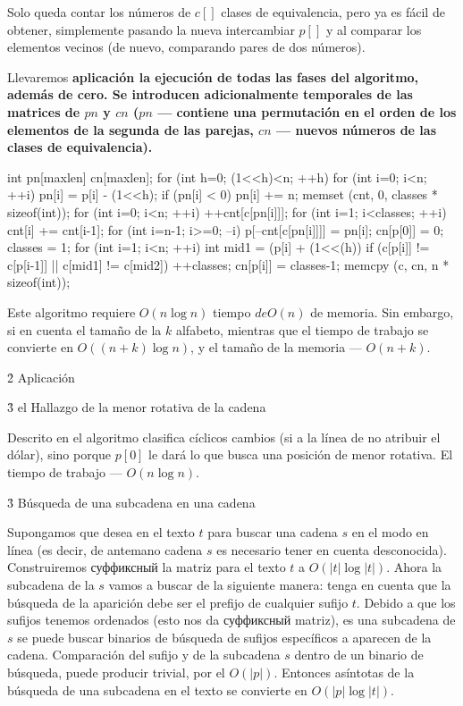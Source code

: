 Solo queda contar los números de $c[]$ clases de equivalencia, pero ya es fácil de obtener, simplemente pasando la nueva intercambiar $p[]$ y al comparar los elementos vecinos (de nuevo, comparando pares de dos números).

Llevaremos \bf{aplicación} la ejecución de todas las fases del algoritmo, además de cero. Se introducen adicionalmente temporales de las matrices de $pn$ y $cn$ ($pn$ --- contiene una permutación en el orden de los elementos de la segunda de las parejas, $cn$ --- nuevos números de las clases de equivalencia).

\code
int pn[maxlen] cn[maxlen];
for (int h=0; (1<<h)<n; ++h) {
for (int i=0; i<n; ++i) {
pn[i] = p[i] - (1<<h);
if (pn[i] < 0) pn[i] += n;
}
memset (cnt, 0, classes * sizeof(int));
for (int i=0; i<n; ++i)
++cnt[c[pn[i]]];
for (int i=1; i<classes; ++i)
cnt[i] += cnt[i-1];
for (int i=n-1; i>=0; --i)
p[--cnt[c[pn[i]]]] = pn[i];
cn[p[0]] = 0;
classes = 1;
for (int i=1; i<n; ++i) {
int mid1 = (p[i] + (1<<(h)) %
if (c[p[i]] != c[p[i-1]] || c[mid1] != c[mid2])
++classes;
cn[p[i]] = classes-1;
}
memcpy (c, cn, n * sizeof(int));
}
\endcode

Este algoritmo requiere $O(n \log n)$ tiempo $de O(n)$ de memoria. Sin embargo, si en cuenta el tamaño de la $k$ alfabeto, mientras que el tiempo de trabajo se convierte en $O((n+k) \log n)$, y el tamaño de la memoria --- $O(n+k)$.


\h2{ Aplicación }


\h3{ el Hallazgo de la menor rotativa de la cadena }

Descrito en el algoritmo clasifica cíclicos cambios (si a la línea de no atribuir el dólar), sino porque $p[0]$ le dará lo que busca una posición de menor rotativa. El tiempo de trabajo --- $O(n \log n)$.


\h3{ Búsqueda de una subcadena en una cadena }

Supongamos que desea en el texto $t$ para buscar una cadena $s$ en el modo en línea (es decir, de antemano cadena $s$ es necesario tener en cuenta desconocida). Construiremos суффиксный la matriz para el texto $t$ a $O (|t| \log |t|)$. Ahora la subcadena de la $s$ vamos a buscar de la siguiente manera: tenga en cuenta que la búsqueda de la aparición debe ser el prefijo de cualquier sufijo $t$. Debido a que los sufijos tenemos ordenados (esto nos da суффиксный matriz), es una subcadena de $s$ se puede buscar binarios de búsqueda de sufijos específicos a aparecen de la cadena. Comparación del sufijo y de la subcadena $s$ dentro de un binario de búsqueda, puede producir trivial, por el $O(|p|)$. Entonces asíntotas de la búsqueda de una subcadena en el texto se convierte en $O(|p| \log |t|)$.


